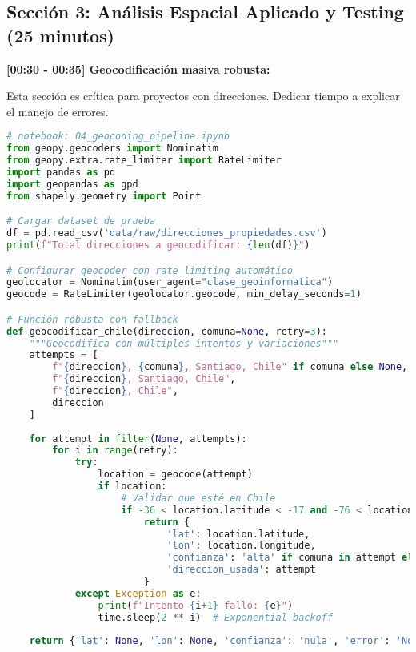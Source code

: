 \documentclass[11pt,a4paper]{article}
\begin{document}
\subsection{Sección 3: Análisis Espacial Aplicado y Testing (25 minutos)}

\textbf{[00:30 - 00:35] Geocodificación masiva robusta:}

\begin{alertbox}
Esta sección es crítica para proyectos con direcciones. Dedicar tiempo a explicar el manejo de errores.
\end{alertbox}

\begin{lstlisting}[language=Python]
# notebook: 04_geocoding_pipeline.ipynb
from geopy.geocoders import Nominatim
from geopy.extra.rate_limiter import RateLimiter
import pandas as pd
import geopandas as gpd
from shapely.geometry import Point

# Cargar dataset de prueba
df = pd.read_csv('data/raw/direcciones_propiedades.csv')
print(f"Total direcciones a geocodificar: {len(df)}")

# Configurar geocoder con rate limiting automático
geolocator = Nominatim(user_agent="clase_geoinformatica")
geocode = RateLimiter(geolocator.geocode, min_delay_seconds=1)

# Función robusta con fallback
def geocodificar_chile(direccion, comuna=None, retry=3):
    """Geocodifica con múltiples intentos y variaciones"""
    attempts = [
        f"{direccion}, {comuna}, Santiago, Chile" if comuna else None,
        f"{direccion}, Santiago, Chile",
        f"{direccion}, Chile",
        direccion
    ]
    
    for attempt in filter(None, attempts):
        for i in range(retry):
            try:
                location = geocode(attempt)
                if location:
                    # Validar que esté en Chile
                    if -36 < location.latitude < -17 and -76 < location.longitude < -66:
                        return {
                            'lat': location.latitude,
                            'lon': location.longitude,
                            'confianza': 'alta' if comuna in attempt else 'media',
                            'direccion_usada': attempt
                        }
            except Exception as e:
                print(f"Intento {i+1} falló: {e}")
                time.sleep(2 ** i)  # Exponential backoff
    
    return {'lat': None, 'lon': None, 'confianza': 'nula', 'error': 'No geocodificado'}


\end{lstlisting}
\end{document}
